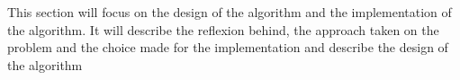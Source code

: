 This section will focus on the design of the algorithm and the implementation of the algorithm. It will describe the reflexion behind, the approach taken on the problem and the choice made for the implementation and describe the design of the algorithm
